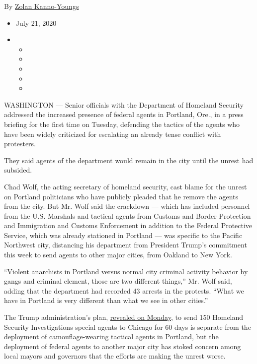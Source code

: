 By \href{https://www.nytimes.com/by/zolan-kanno-youngs}{Zolan
Kanno-Youngs}

\begin{itemize}
\item
  July 21, 2020
\item
  \begin{itemize}
  \item
  \item
  \item
  \item
  \item
  \end{itemize}
\end{itemize}

WASHINGTON --- Senior officials with the Department of Homeland Security
addressed the increased presence of federal agents in Portland, Ore., in
a press briefing for the first time on Tuesday, defending the tactics of
the agents who have been widely criticized for escalating an already
tense conflict with protesters.

They said agents of the department would remain in the city until the
unrest had subsided.

Chad Wolf, the acting secretary of homeland security, cast blame for the
unrest on Portland politicians who have publicly pleaded that he remove
the agents from the city. But Mr. Wolf said the crackdown --- which has
included personnel from the U.S. Marshals and tactical agents from
Customs and Border Protection and Immigration and Customs Enforcement in
addition to the Federal Protective Service, which was already stationed
in Portland --- was specific to the Pacific Northwest city, distancing
his department from President Trump's commitment this week to send
agents to other major cities, from Oakland to New York.

``Violent anarchists in Portland versus normal city criminal activity
behavior by gangs and criminal element, those are two different
things,'' Mr. Wolf said, adding that the department had recorded 43
arrests in the protests. ``What we have in Portland is very different
than what we see in other cities.''

The Trump administration's plan,
\href{https://www.nytimes.com/2020/07/20/us/politics/trump-chicago-portland-federal-agents.html}{revealed
on Monday}, to send 150 Homeland Security Investigations special agents
to Chicago for 60 days is separate from the deployment of
camouflage-wearing tactical agents in Portland, but the deployment of
federal agents to another major city has stoked concern among local
mayors and governors that the efforts are making the unrest worse.

